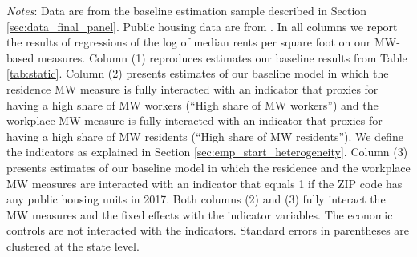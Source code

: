 \begin{table}[hbt!]
    \begin{minipage}{.95\textwidth} \footnotesize
        \vspace{2mm}
        \textit{Notes}: 
        Data are from the baseline estimation sample described in Section 
        \ref{sec:data_final_panel}.
        Public housing data are from \textcite{hudHousing}.
        In all columns we report the results of regressions of the log of median rents 
        per square foot on our MW-based measures.
        Column (1) reproduces estimates our baseline results from Table \ref{tab:static}.
        Column (2) presents estimates of our baseline model in which the residence MW 
        measure is fully interacted with an indicator that proxies for having a high share 
        of MW workers (``High share of MW workers'') and the workplace MW measure is 
        fully interacted with an indicator that proxies for having a high share of MW 
        residents (``High share of MW residents'').
        We define the indicators as explained in Section \ref{sec:emp_start_heterogeneity}.
        Column (3) presents estimates of our baseline model in which the residence and 
        the workplace MW measures are interacted with an indicator that equals 1 if 
        the ZIP code has any public housing units in 2017.
        Both columns (2) and (3) fully interact the MW measures and the fixed effects
        with the indicator variables. The economic controls are not interacted with 
        the indicators.
        Standard errors in parentheses are clustered at the state level.
    \end{minipage}
\end{table}
